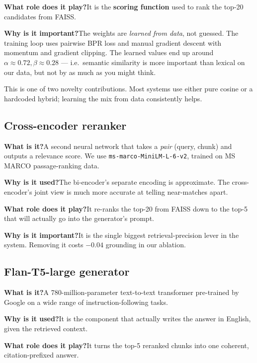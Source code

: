 \documentclass[11pt,a4paper]{article}
\begin{document}
\textbf{What role does it play?}\quad It is the \textbf{scoring function} used to rank the top-20 candidates from FAISS.

\textbf{Why is it important?}\quad The weights are \emph{learned from data}, not guessed. The training loop uses pairwise BPR loss and manual gradient descent with momentum and gradient clipping. The learned values end up around $\alpha \approx 0.72, \beta \approx 0.28$ --- i.e.\ semantic similarity is more important than lexical on our data, but not by as much as you might think.

\begin{why}
This is one of two novelty contributions. Most systems use either pure cosine or a hardcoded hybrid; learning the mix from data consistently helps.
\end{why}

\subsection{Cross-encoder reranker}

\textbf{What is it?}\quad A second neural network that takes a \emph{pair} (query, chunk) and outputs a relevance score. We use \texttt{ms-marco-MiniLM-L-6-v2}, trained on MS MARCO passage-ranking data.

\textbf{Why is it used?}\quad The bi-encoder's separate encoding is approximate. The cross-encoder's joint view is much more accurate at telling near-matches apart.

\textbf{What role does it play?}\quad It re-ranks the top-20 from FAISS down to the top-5 that will actually go into the generator's prompt.

\textbf{Why is it important?}\quad It is the single biggest retrieval-precision lever in the system. Removing it costs $-0.04$ grounding in our ablation.

\subsection{Flan-T5-large generator}

\textbf{What is it?}\quad A 780-million-parameter text-to-text transformer pre-trained by Google on a wide range of instruction-following tasks.

\textbf{Why is it used?}\quad It is the component that actually writes the answer in English, given the retrieved context.

\textbf{What role does it play?}\quad It turns the top-5 reranked chunks into one coherent, citation-prefixed answer.
\end{document}
